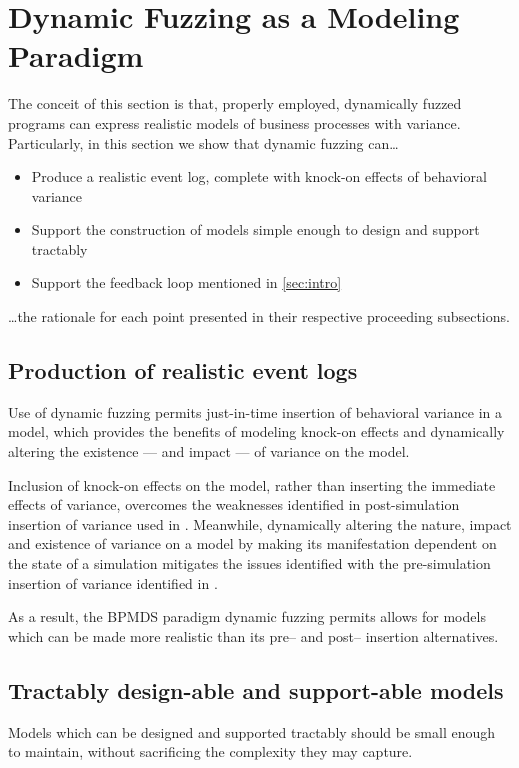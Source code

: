 \documentclass[12pt]{llncs}  %
\begin{document}
\section{Dynamic Fuzzing as a Modeling Paradigm}
\label{sec:dynamic_fuzzing_benefits}
The conceit of this section is that, properly employed, dynamically fuzzed
programs can express realistic models of business processes with variance.
Particularly, in this section we show that dynamic fuzzing can\ldots{}
\par

\begin{itemize}
\item Produce a realistic event log, complete with knock-on effects of
  behavioral variance
\item Support the construction of models simple enough to design and support
  tractably
\item Support the feedback loop mentioned in \cref{sec:intro}
\end{itemize}

\ldots{}the rationale for each point presented in their respective proceeding
subsections.

\subsection{Production of realistic event logs}
Use of dynamic fuzzing permits just-in-time insertion of behavioral variance in
a model, which provides the benefits of modeling knock-on effects and
dynamically altering the existence --- and impact --- of variance on the model.
\par

Inclusion of knock-on effects on the model, rather than inserting the immediate
effects of variance, overcomes the weaknesses identified in post-simulation
insertion of variance used in \cite{accorsi2013secsy}. Meanwhile, dynamically
altering the nature, impact and existence of variance on a model by making its
manifestation dependent on the state of a simulation mitigates the issues
identified with the pre-simulation insertion of variance identified in
\cite{pourmasoumi2015business}.
\par

As a result, the BPMDS paradigm dynamic fuzzing permits allows for models which
can be made more realistic than its pre-- and post-- insertion alternatives.
\par


\subsection{Tractably design-able and support-able models}
Models which can be designed and supported tractably should be small enough to
maintain, without sacrificing the complexity they may capture.
\par
\end{document}
